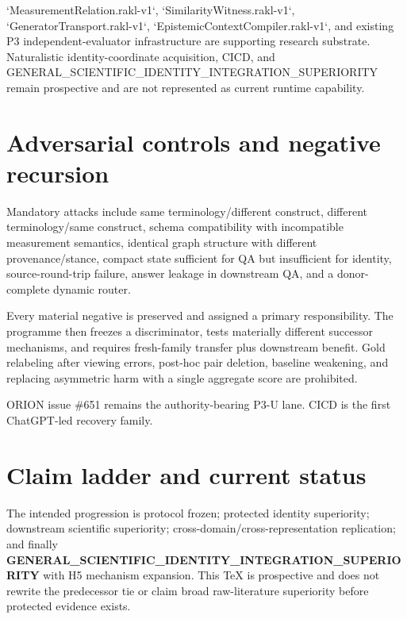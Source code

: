 \documentclass[11pt]{article}
\begin{document}
`MeasurementRelation.rakl-v1`, `SimilarityWitness.rakl-v1`, `GeneratorTransport.rakl-v1`, `EpistemicContextCompiler.rakl-v1`, and existing P3 independent-evaluator infrastructure are supporting research substrate. Naturalistic identity-coordinate acquisition, CICD, and GENERAL\_SCIENTIFIC\_IDENTITY\_INTEGRATION\_SUPERIORITY remain prospective and are not represented as current runtime capability.

\section{Adversarial controls and negative recursion}
Mandatory attacks include same terminology/different construct, different terminology/same construct, schema compatibility with incompatible measurement semantics, identical graph structure with different provenance/stance, compact state sufficient for QA but insufficient for identity, source-round-trip failure, answer leakage in downstream QA, and a donor-complete dynamic router.

Every material negative is preserved and assigned a primary responsibility. The programme then freezes a discriminator, tests materially different successor mechanisms, and requires fresh-family transfer plus downstream benefit. Gold relabeling after viewing errors, post-hoc pair deletion, baseline weakening, and replacing asymmetric harm with a single aggregate score are prohibited.

ORION issue \#651 remains the authority-bearing P3-U lane. CICD is the first ChatGPT-led recovery family.

\section{Claim ladder and current status}
The intended progression is protocol frozen; protected identity superiority; downstream scientific superiority; cross-domain/cross-representation replication; and finally \textbf{GENERAL\_SCIENTIFIC\_IDENTITY\_INTEGRATION\_SUPERIORITY} with H5 mechanism expansion. This TeX is prospective and does not rewrite the predecessor tie or claim broad raw-literature superiority before protected evidence exists.
\end{document}
